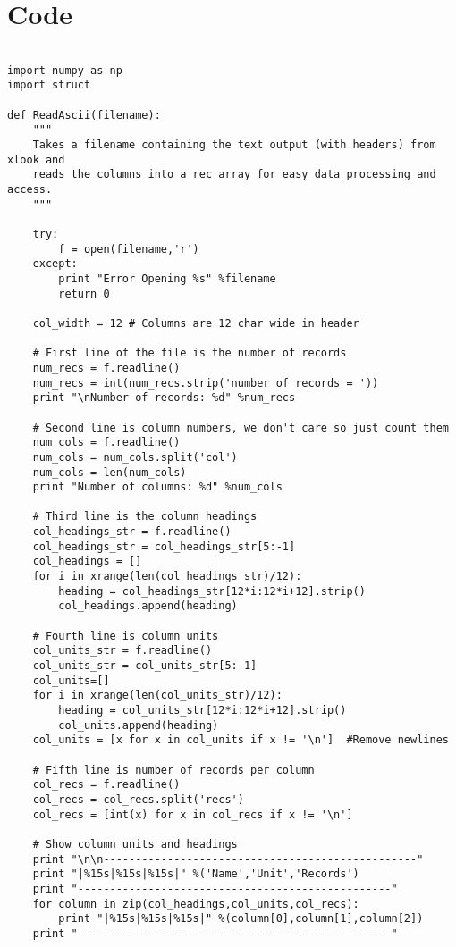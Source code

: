 \documentclass[a4paper,11pt,oneside]{article}
\begin{document}
\section{Code}
\begin{lstlisting}

import numpy as np
import struct

def ReadAscii(filename):
    """
    Takes a filename containing the text output (with headers) from xlook and
    reads the columns into a rec array for easy data processing and access.
    """

    try:
        f = open(filename,'r')
    except:
        print "Error Opening %s" %filename
        return 0
    
    col_width = 12 # Columns are 12 char wide in header
    
    # First line of the file is the number of records
    num_recs = f.readline()
    num_recs = int(num_recs.strip('number of records = '))
    print "\nNumber of records: %d" %num_recs
    
    # Second line is column numbers, we don't care so just count them
    num_cols = f.readline()
    num_cols = num_cols.split('col')
    num_cols = len(num_cols)
    print "Number of columns: %d" %num_cols
    
    # Third line is the column headings
    col_headings_str = f.readline()
    col_headings_str = col_headings_str[5:-1]
    col_headings = []
    for i in xrange(len(col_headings_str)/12):
        heading = col_headings_str[12*i:12*i+12].strip()
        col_headings.append(heading)

    # Fourth line is column units
    col_units_str = f.readline()
    col_units_str = col_units_str[5:-1]
    col_units=[]
    for i in xrange(len(col_units_str)/12):
        heading = col_units_str[12*i:12*i+12].strip()
        col_units.append(heading)
    col_units = [x for x in col_units if x != '\n']  #Remove newlines
    
    # Fifth line is number of records per column
    col_recs = f.readline()
    col_recs = col_recs.split('recs')
    col_recs = [int(x) for x in col_recs if x != '\n']
    
    # Show column units and headings
    print "\n\n-------------------------------------------------"
    print "|%15s|%15s|%15s|" %('Name','Unit','Records')
    print "-------------------------------------------------"
    for column in zip(col_headings,col_units,col_recs):
        print "|%15s|%15s|%15s|" %(column[0],column[1],column[2])
    print "-------------------------------------------------"
    

\end{lstlisting}
\end{document}
